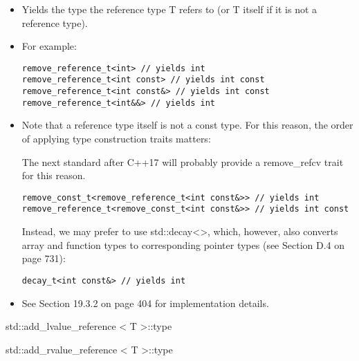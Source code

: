 \begin{itemize}
\item
Yields the type the reference type T refers to (or T itself if it is not a reference type).

\item
For example:
\begin{lstlisting}[style=styleCXX]
remove_reference_t<int> // yields int
remove_reference_t<int const> // yields int const
remove_reference_t<int const&> // yields int const
remove_reference_t<int&&> // yields int
\end{lstlisting}

\item
Note that a reference type itself is not a const type. For this reason, the order of applying type
construction traits matters:

\begin{tcolorbox}[colback=webgreen!5!white,colframe=webgreen!75!black]
\hspace*{0.75cm}The next standard after C++17 will probably provide a remove\_refcv trait for this reason.
\end{tcolorbox}

\begin{lstlisting}[style=styleCXX]
remove_const_t<remove_reference_t<int const&>> // yields int
remove_reference_t<remove_const_t<int const&>> // yields int const
\end{lstlisting}

Instead, we may prefer to use std::decay<>, which, however, also converts array and function types to corresponding pointer types (see Section D.4 on page 731):

\begin{lstlisting}[style=styleCXX]
decay_t<int const&> // yields int
\end{lstlisting}

\item
See Section 19.3.2 on page 404 for implementation details.
\end{itemize}

std::add\_lvalue\_reference < T >::type

std::add\_rvalue\_reference < T >::type

